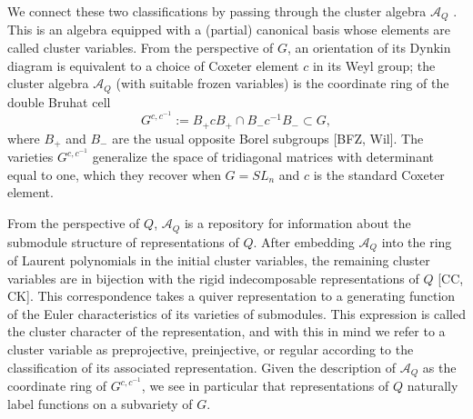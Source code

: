 \documentclass[12pt]{amsart}
\newcommand{\cA}{\mathcal{A}}
\numberwithin{equation}{section}
\begin{document}
We connect these two classifications by passing through the cluster algebra $\cA_Q$ \cite{FZ02}. 
This is an algebra equipped with a (partial) canonical basis whose elements are called cluster variables. 
From the perspective of $G$, an orientation of its Dynkin diagram is equivalent to a choice of Coxeter element $c$ in its Weyl group; the cluster algebra $\cA_Q$ (with suitable frozen variables) is the coordinate ring of the double Bruhat cell  $$G^{c,c^{-1}} := B_+ c B_+ \cap B_- c^{-1} B_- \subset G,$$
where $B_+$ and $B_-$ are the usual opposite Borel subgroups [BFZ, Wil]. 
The varieties $G^{c,c^{-1}}$ generalize the space of tridiagonal matrices with determinant equal to one, which they recover when $G=SL_n$ and $c$ is the standard Coxeter element.

From the perspective of $Q$, $\cA_Q$ is a repository for information about the submodule structure of representations of $Q$. 
After embedding $\cA_Q$ into the ring of Laurent polynomials in the initial cluster variables, the remaining cluster variables are in bijection with the rigid indecomposable representations of $Q$ [CC, CK]. 
This correspondence takes a quiver representation to a generating function of the Euler characteristics of its varieties of submodules. 
This expression is called the cluster character of the representation, and with this in mind we refer to a cluster variable as preprojective, preinjective, or regular according to the classification of its associated representation. 
Given the description of $\cA_Q$ as the coordinate ring of $G^{c,c^{-1}}$, we see in particular that representations of $Q$ naturally label functions on a subvariety of $G$.

\end{document}
